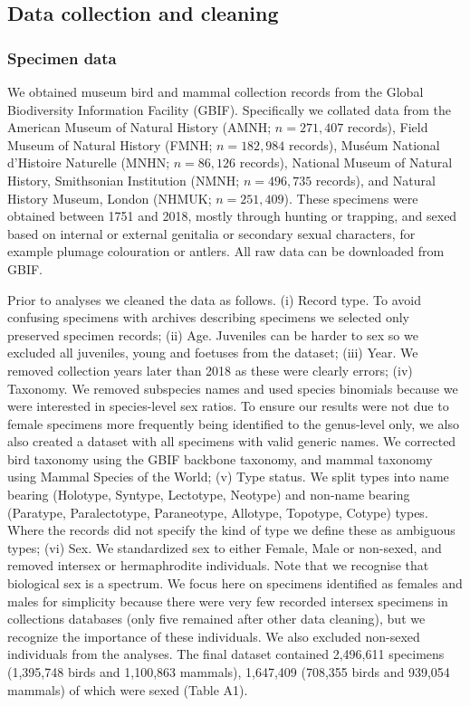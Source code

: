 \documentclass[a4paper, 12pt]{article}
\begin{document}
\subsection{Data collection and cleaning}
\subsubsection{Specimen data} 
We obtained museum bird and mammal collection records from the Global Biodiversity Information Facility (GBIF\cite{gbif}). 
Specifically we collated data from the American Museum of Natural History (AMNH; $n = 271,407$ records\cite{amnh-birds,amnh-mammals}), Field Museum of Natural History (FMNH; $n = 182,984$ records\cite{fmnh-birds,fmnh-mammals}), Mus\'{e}um National d'Histoire Naturelle (MNHN; $n = 86,126$ records\cite{mnhn-birds,mnhn-mammals}), National Museum of Natural History, Smithsonian Institution (NMNH; $n = 496,735$ records\cite{smithsonian-both}), and Natural History Museum, London (NHMUK; $n = 251,409$\cite{nhm-all}).
These specimens were obtained between 1751 and 2018, mostly through hunting or trapping, and sexed based on internal or external genitalia or secondary sexual characters, for example plumage colouration or antlers.
All raw data can be downloaded from GBIF\cite{gbif}.
 
Prior to analyses we cleaned the data as follows. 
(i) Record type. To avoid confusing specimens with archives describing specimens we selected only preserved specimen records; 
(ii) Age. Juveniles can be harder to sex so we excluded all juveniles, young and foetuses from the dataset; 
(iii) Year. We removed collection years later than 2018 as these were clearly errors; 
(iv) Taxonomy. We removed subspecies names and used species binomials because we were interested in species-level sex ratios. 
To ensure our results were not due to female specimens more frequently being identified to the genus-level only, we also also created a dataset with all specimens with valid generic names.
We corrected bird taxonomy using the GBIF backbone taxonomy\cite{gbif}, and mammal taxonomy using Mammal Species of the World\cite{wilson2005mammal}; 
(v) Type status. We split types into name bearing (Holotype, Syntype, Lectotype, Neotype) and non-name bearing (Paratype, Paralectotype, Paraneotype, Allotype, Topotype, Cotype) types. Where the records did not specify the kind of type we define these as ambiguous types; 
(vi) Sex. We standardized sex to either Female, Male or non-sexed, and removed intersex or hermaphrodite individuals. 
Note that we recognise that biological sex is a spectrum\cite{sciam2017}. 
We focus here on specimens identified as females and males for simplicity because there were very few recorded intersex specimens in collections databases (only five remained after other data cleaning), but we recognize the importance of these individuals.
We also excluded non-sexed individuals from the analyses.
The final dataset contained 2,496,611 specimens (1,395,748 birds and 1,100,863 mammals), 1,647,409 (708,355 birds and 939,054 mammals) of which were sexed (Table A1).
\end{document}
